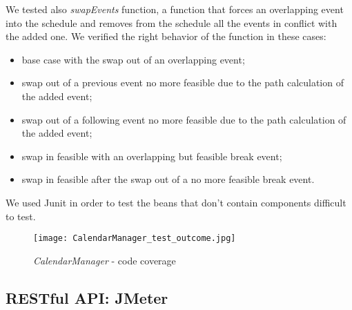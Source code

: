 We tested also \textit{swapEvents} function, a function that forces an overlapping event into the schedule and removes from the schedule all the events in conflict with the added one. We verified the right behavior of the function in these cases:
\begin{itemize}
\item base case with the swap out of an overlapping event;
\item swap out of a previous event no more feasible due to the path calculation of the added event;
\item swap out of a following event no more feasible due to the path calculation of the added event;
\item swap in feasible with an overlapping but feasible break event;
\item swap in feasible after the swap out of a no more feasible break event.\\
\end{itemize}
We used Junit in order to test the beans that don't contain components difficult to test.
\begin{figure}[H]
	\begin{center}
		\texttt{[image: CalendarManager\_test\_outcome.jpg]}
	\end{center}
\caption{ \textit{CalendarManager} - code coverage}
\end{figure}

\subsection{RESTful API: JMeter}


